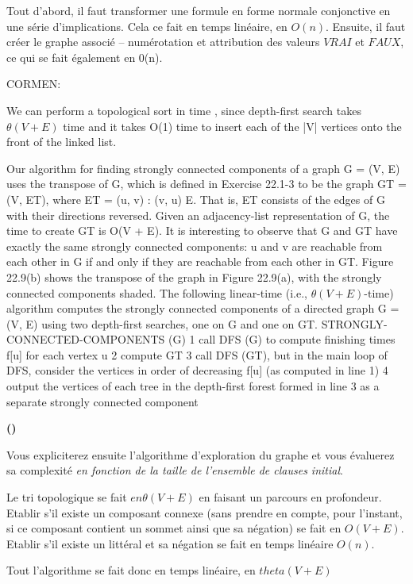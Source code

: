 \documentclass{article}
\newcounter{enoncecount}
\newcounter{sousenoncecount}
\newenvironment{sousenonce}
{%
\stepcounter{sousenoncecount}
\bf\small (\alph{sousenoncecount})
\begin{bf}
}
{%
\end{bf}
}
\begin{document}
Tout d'abord, il faut transformer une formule en forme normale conjonctive en une série d'implications. Cela ce fait en temps linéaire, en $O(n)$. Ensuite, il faut créer le graphe associé -- numérotation et attribution des valeurs $VRAI$ et $FAUX$, ce qui se fait également en 0(n). 


CORMEN:

We can perform a topological sort in time , since depth-first search takes $\theta(V + E)$
time and it takes O(1) time to insert each of the |V| vertices onto the front of the linked list.


Our algorithm for finding strongly connected components of a graph G = (V, E) uses the
transpose of G, which is defined in Exercise 22.1-3 to be the graph GT = (V, ET), where ET =
{(u, v) : (v, u) E}. That is, ET consists of the edges of G with their directions reversed. Given
an adjacency-list representation of G, the time to create GT is O(V + E). It is interesting to
observe that G and GT have exactly the same strongly connected components: u and v are
reachable from each other in G if and only if they are reachable from each other in GT. Figure
22.9(b) shows the transpose of the graph in Figure 22.9(a), with the strongly connected
components shaded.
The following linear-time (i.e., $\theta(V + E)$-time) algorithm computes the strongly connected
components of a directed graph G = (V, E) using two depth-first searches, one on G and one
on GT.
STRONGLY-CONNECTED-COMPONENTS (G)
1 call DFS (G) to compute finishing times f[u] for each vertex u
2 compute GT
3 call DFS (GT), but in the main loop of DFS, consider the vertices
in order of decreasing f[u] (as computed in line 1)
4 output the vertices of each tree in the depth-first forest formed in
line 3 as a
separate strongly connected component

\begin{sousenonce}
Vous expliciterez ensuite l'algorithme d'exploration du graphe et vous évaluerez sa complexité {\it en fonction de la taille de l'ensemble de clauses initial}.
\end{sousenonce}

Le tri topologique se fait $en \theta(V + E)$ en faisant un parcours en profondeur. Etablir s'il existe un composant connexe (sans prendre en compte, pour l'instant, si ce composant contient un sommet ainsi que sa négation) se fait en $O(V + E)$. Etablir s'il existe un littéral et sa négation se fait en temps linéaire $O(n)$. 

Tout l'algorithme se fait donc en temps linéaire, en $theta(V + E)$
\end{document}
